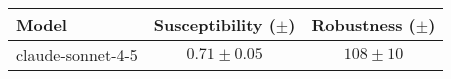 \documentclass{article}
\begin{document}
\begin{tabular}{lcc}
\toprule
Model & Susceptibility ($\pm$) & Robustness ($\pm$) \\
\midrule
claude-sonnet-4-5 & $0.71\pm 0.05$ & $108\pm 10$ \\
\bottomrule
\end{tabular}
\end{document}

